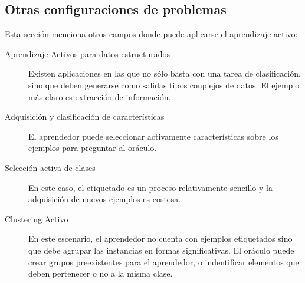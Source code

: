 \documentclass[11pt,spanish]{article}
\begin{document}
\subsection{Otras configuraciones de problemas}
Esta sección menciona otros campos donde puede aplicarse el aprendizaje activo:
\begin{description}
    \item[Aprendizaje Activos para datos estructurados] Existen aplicaciones en
    las que no sólo basta con una tarea de clasificación, sino que deben
    generarse como salidas tipos conplejos de datos. El ejemplo más claro es
    extracción de información.
    \item[Adquisición y clasificación de características] El aprendedor puede
    seleccionar activamente características sobre los ejemplos para preguntar
    al oráculo.
    \item[Selección activa de clases] En este caso, el etiquetado es un proceso
    relativamente sencillo y la adquisición de nuevos ejemplos es costosa.
    \item[Clustering Activo] En este escenario, el aprendedor no cuenta con
    ejemplos etiquetados sino que debe agrupar las instancias en formas
    significativas. El oráculo puede crear grupos preexistentes para el
    aprendedor, o indentificar elementos que deben pertenecer o no a la misma
    clase.
\end{description}
\end{document}
